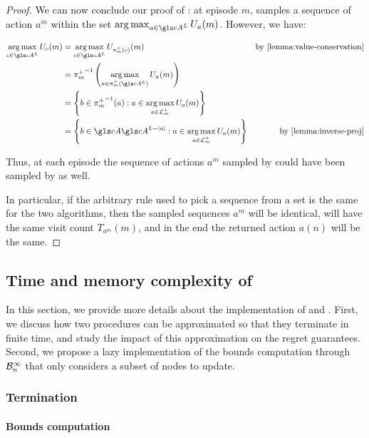 \begin{proof}
	We can now conclude our proof of : at episode $m$, \KLOLOP samples a sequence of action $a^m$ within the set $\argmax_{a\in \cA^L} U_a(m)$. 
	However, we have:
	
	\begin{align*}
	\argmax_{c\in \cA^L} U_c(m) &= \argmax_{c\in \cA^L} U_{\pi_m^+(c)}(m) & \text{by \Cref{lemma:value-conservation}} \\
	&= {\pi_m^+}^{-1}\left(\argmax_{a\in {\pi_m^+}(\cA^L)} U_{a}(m)\right) & \\
	&= \left\{b\in{\pi_m^+}^{-1}(a) : a\in \argmax_{a\in \LL_m^+} U_{a}(m)\right\} & \\
	&= \left\{b\in \cA \cA^{L-|a|} : a\in \argmax_{a\in \LL_m^+} U_{a}(m)\right\} & \text{by \Cref{lemma:inverse-proj}} 
	\end{align*}
	
	Thus, at each episode the sequence of actions $a^m$ sampled by  could have been sampled by  as well.
	
	In particular, if the arbitrary rule used to pick a sequence from a set is the same for the two algorithms, then the sampled sequences $a^m$ will be identical, will have the same visit count $T_{a^m}(m)$, and in the end the returned action $a(n)$ will be the same.
\end{proof}

\subsection{Time and memory complexity of \GBOP}
\label{sec:gbop-implementation}

In this section, we provide more details about the implementation of \GBOPD and \GBOP. First, we discuss how two procedures can be approximated so that they terminate in finite time, and study the impact of this approximation on the regret guarantees. Second, we propose a lazy implementation of the bounds computation through $\mathcal{B}_n^\infty$ that only considers a subset of nodes to update.

\subsubsection{Termination}

\paragraph{Bounds computation}

